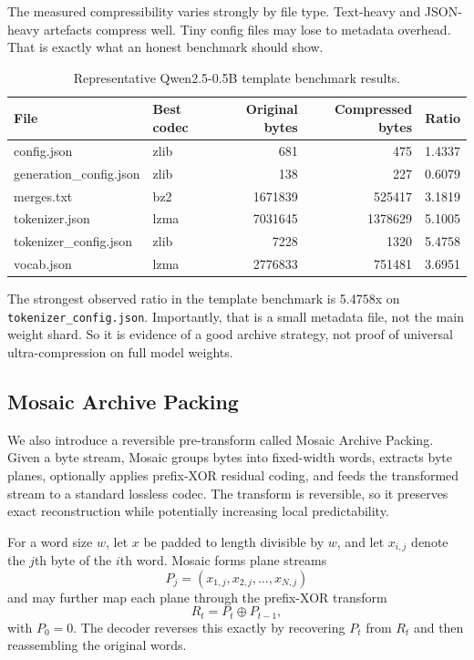 \documentclass[11pt]{article}
\begin{document}
The measured compressibility varies strongly by file type. Text-heavy and JSON-heavy artefacts compress well. Tiny config files may lose to metadata overhead. That is exactly what an honest benchmark should show.

\begin{table}[h]
\centering
\begin{tabular}{l l r r r}
\toprule
File & Best codec & Original bytes & Compressed bytes & Ratio \\
\midrule
config.json & zlib & 681 & 475 & 1.4337 \\
generation\_config.json & zlib & 138 & 227 & 0.6079 \\
merges.txt & bz2 & 1671839 & 525417 & 3.1819 \\
tokenizer.json & lzma & 7031645 & 1378629 & 5.1005 \\
tokenizer\_config.json & zlib & 7228 & 1320 & 5.4758 \\
vocab.json & lzma & 2776833 & 751481 & 3.6951 \\
\bottomrule
\end{tabular}
\caption{Representative Qwen2.5-0.5B template benchmark results.}
\end{table}

The strongest observed ratio in the template benchmark is 5.4758x on \texttt{tokenizer\_config.json}. Importantly, that is a small metadata file, not the main weight shard. So it is evidence of a good archive strategy, not proof of universal ultra-compression on full model weights.


\subsection{Mosaic Archive Packing}
We also introduce a reversible pre-transform called Mosaic Archive Packing. Given a byte stream, Mosaic groups bytes into fixed-width words, extracts byte planes, optionally applies prefix-XOR residual coding, and feeds the transformed stream to a standard lossless codec. The transform is reversible, so it preserves exact reconstruction while potentially increasing local predictability.

For a word size $w$, let $x$ be padded to length divisible by $w$, and let $x_{i,j}$ denote the $j$th byte of the $i$th word. Mosaic forms plane streams
\[
P_j = (x_{1,j}, x_{2,j}, \dots, x_{N,j})
\]
and may further map each plane through the prefix-XOR transform\[
R_t = P_t \oplus P_{t-1},
\]
with $P_0=0$. The decoder reverses this exactly by recovering $P_t$ from $R_t$ and then reassembling the original words.
\end{document}
